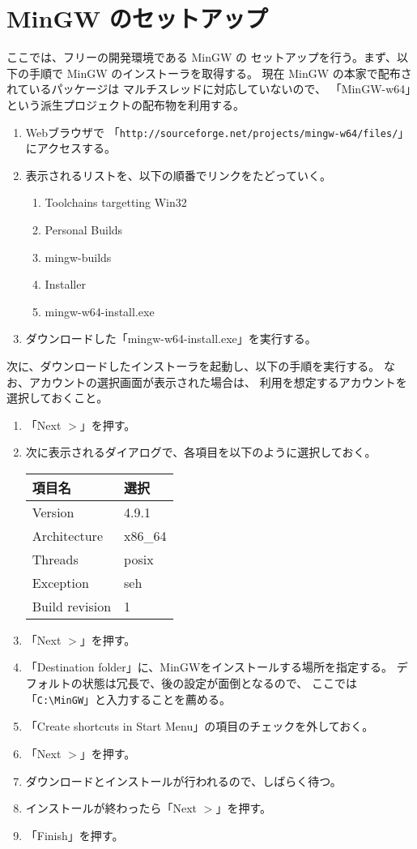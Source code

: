 \documentclass[a4j]{jarticle}
\begin{document}
\section{MinGW のセットアップ}
ここでは、フリーの開発環境である MinGW の
セットアップを行う。まず、以下の手順で MinGW のインストーラを取得する。
現在 MinGW の本家で配布されているパッケージは
マルチスレッドに対応していないので、
「MinGW-w64」という派生プロジェクトの配布物を利用する。

\begin{enumerate}
 \item Webブラウザで
	「\verb+http://sourceforge.net/projects/mingw-w64/files/+」にアクセスする。

 \item 表示されるリストを、以下の順番でリンクをたどっていく。
 \begin{enumerate}
	\item Toolchains targetting Win32
	\item Personal Builds
	\item mingw-builds
	\item Installer
	\item mingw-w64-install.exe
 \end{enumerate}

 \item ダウンロードした「mingw-w64-install.exe」を実行する。
\end{enumerate}

次に、ダウンロードしたインストーラを起動し、以下の手順を実行する。
なお、アカウントの選択画面が表示された場合は、
利用を想定するアカウントを選択しておくこと。
\begin{enumerate}
 \item 「Next \(>\)」を押す。
 \item 次に表示されるダイアログで、各項目を以下のように選択しておく。	
	\begin{center}
	\begin{tabular}{|l|l|}
		\hline
		項目名 & 選択 \\ \hline
		Version &  4.9.1 \\ \hline
		Architecture & x86\_64 \\ \hline
		Threads & posix \\ \hline
		Exception & seh \\ \hline
		Build revision & 1 \\ \hline
	\end{tabular}
	\end{center}
 \item 「Next \(>\)」を押す。
 \item 「Destination folder」に、MinGWをインストールする場所を指定する。
	デフォルトの状態は冗長で、後の設定が面倒となるので、
	ここでは「\verb+C:\MinGW+」と入力することを薦める。
 \item 「Create shortcuts in Start Menu」の項目のチェックを外しておく。
 \item 「Next \(>\)」を押す。
 \item ダウンロードとインストールが行われるので、しばらく待つ。
 \item インストールが終わったら「Next \(>\)」を押す。
 \item 「Finish」を押す。
\end{enumerate}
\end{document}
